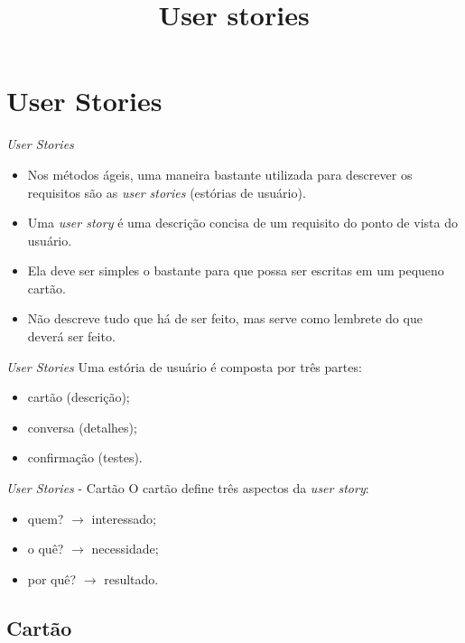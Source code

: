 \documentclass[11pt]{beamer}
\title{User stories}
\author{}
\date{}
\begin{document}
    \begin{frame}[plain]
        \titlepage
    \end{frame}

   \section{User Stories}

   \begin{frame}{\textit{User Stories}}
      \begin{itemize}
         \item Nos métodos ágeis, uma maneira bastante utilizada para descrever os requisitos são as \textit{user stories} (estórias de usuário).
         \item Uma \textit{user story} é uma descrição concisa de um requisito do ponto de vista do usuário.
         \item Ela deve ser simples o bastante para que possa ser escritas em um pequeno cartão.
         \item Não descreve tudo que há de ser feito, mas serve como lembrete do que deverá ser feito.
      \end{itemize}
   \end{frame}

   \begin{frame}{\textit{User Stories}}
      Uma estória de usuário é composta por três partes:
      \begin{itemize}
         \item cartão (descrição);
         \item conversa (detalhes);
         \item confirmação (testes).
      \end{itemize}
   \end{frame}

   \begin{frame}{\textit{User Stories} - Cartão}
      O cartão define três aspectos da \textit{user story}:
      \begin{itemize}
         \item quem? $\rightarrow$ interessado;
         \item o quê? $\rightarrow$ necessidade;
         \item por quê? $\rightarrow$ resultado.
      \end{itemize}
   \end{frame}

   \subsection{Cartão}
\end{document}
